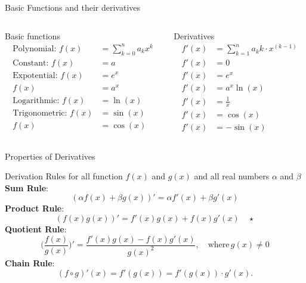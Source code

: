 \documentclass[10pt, aspectratio=1610]{beamer}
\begin{document}
\begin{frame}{Basic Functions and their derivatives}
  \begin{columns}
    \begin{column}{0.5\textwidth}
      \begin{block}{Basic functions}
      \begin{align*}
        \text{Polynomial}:\,f(x) &=\sum_{k=0}^n a_{k} x^{k}\\
        \text{Constant}:\, f(x) &=a\\
        \text{Expotential}:\, f(x) &= e^{x}\\
        f(x) &= a^{x}\\
        \text{Logarithmic}:\, f(x) &= \ln{(x)}\\
        \text{Trigonometric}:\, f(x) &=\sin{(x)}\\
        f(x) &=\cos{(x)}
      \end{align*}
      \end{block}
    \end{column}
    \begin{column}{0.5\textwidth}
      \begin{block}{Derivatives}
      \begin{align*}
        f'(x) &=\sum_{k=1}^{n} a_{k} k\cdot x^{(k-1)}\\
        f'(x) &=0\\
        f'(x) &=e^{x}\\
        f'(x) &=a^{x}\ln{(x)}\\
        f'(x) &=\frac{1}{x}\\
        f'(x) &=\cos{(x)}\\
        f'(x) &=-\sin{(x)}
      \end{align*}
      \end{block}
    \end{column}
  \end{columns}
\end{frame}

\begin{frame}{Properties of Derivatives}
  \begin{block}{Derivation Rules for all function $f(x)$ and $g(x)$ and all real numbers $\alpha$ and $\beta$}
    \textbf{Sum Rule}: 
    \[(\alpha f(x) +\beta g(x))'=\alpha f'(x)+\beta g'(x)\]
    \textbf{Product Rule}:
    \begin{equation}\label{eq:2}
      (f(x)g(x))'=f'(x)g(x)+f(x)g'(x) \quad \star
    \end{equation}
    \textbf{Quotient Rule}:
    \[\bigl(\frac{f(x)}{g(x)}\bigr)'=\frac{f'(x)g(x)-f(x)g'(x)}{{g(x)}^2}, \quad \text{where}\,g(x)\neq 0\]
    \textbf{Chain Rule}:
    \[(f \circ g)'(x)=f'(g(x))=f'(g(x))\cdot g'(x).\]
  \end{block}
\end{frame}
\end{document}
